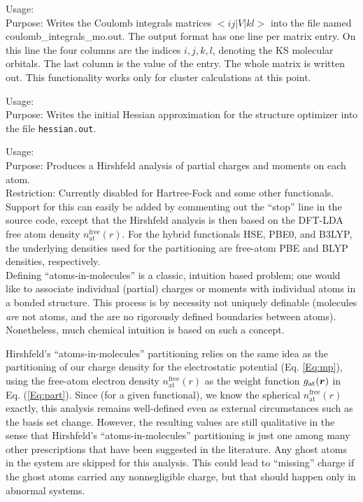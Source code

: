 {
  \noindent
  Usage:   \\[1.0ex]
  Purpose: Writes the Coulomb integrals matrices $<ij|V|kl>$ into the file named
  \rm{coulomb\_integrals\_mo.out}. The output format has one line per
  matrix entry. On this line the four columns are the indices $i, j, k, l$, denoting
  the KS molecular orbitals.
  The last column is the value of the entry. The whole matrix is written out.
  This functionality works only for cluster calculations at this point.
}

{
  \noindent
  Usage:   \\[1.0ex]
  Purpose: Writes the initial Hessian approximation for the structure
  optimizer into the file \texttt{hessian.out}. \\[1.0ex]
}

{
  \noindent
  Usage:   \\[1.0ex]
  Purpose: Produces a Hirshfeld analysis of partial charges and
    moments on each atom. \\[1.0ex]
    Restriction: Currently disabled for Hartree-Fock and some other
    functionals. Support for this can easily be added by commenting
    out the ``stop'' line in the source code, except that the
    Hirshfeld analysis is then based on the DFT-LDA free atom density
    $n_\text{at}^\text{free}(r)$.
    For the hybrid functionals HSE, PBE0, and B3LYP, the underlying
    densities used for the partitioning are free-atom PBE and BLYP
    densities, respectively.  \\[1.0ex]
}
Defining ``atoms-in-molecules'' is a classic, intuition based problem;
one would like to associate individual (partial) charges or moments
with individual atoms in a bonded structure. This process is by
necessity not uniquely definable (molecules \emph{are} not atoms, and
the are no rigorously defined boundaries between atoms). Nonetheless,
much chemical intuition is based on such a concept.

Hirshfeld's \cite{Hirshfeld77} ``atoms-in-molecules'' partitioning
relies on the same idea as the partitioning of our charge density for
the electrostatic potential (Eq. \ref{Eq:mp}), using the free-atom
electron density $n_\text{at}^\text{free}(r)$ as the weight function
$g_\text{at}(\mbox{\boldmath$r$})$ in Eq. (\ref{Eq:part}). Since (for a given
functional), we know the spherical $n_\text{at}^\text{free}(r)$
exactly, this analysis remains well-defined even as external
circumstances such as the basis set change. However, the resulting
values are still qualitative in the sense that Hirshfeld's
\cite{Hirshfeld77} ``atoms-in-molecules'' partitioning is just one
among many other prescriptions that have been suggested in the
literature. Any ghost atoms in the system are skipped for this analysis.
This could lead to ``missing'' charge if the ghost atoms carried any
nonnegligible charge, but that should happen only in abnormal systems.

